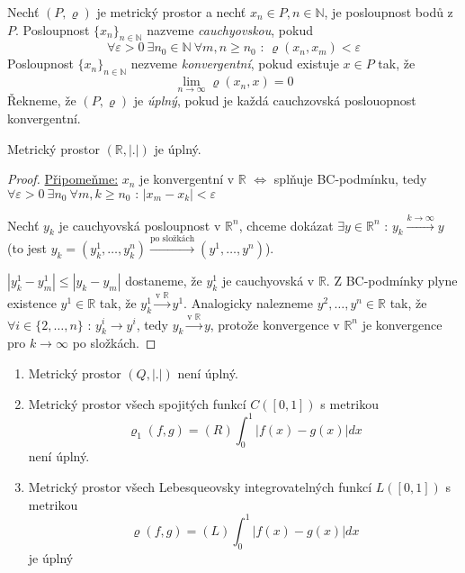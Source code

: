 \begin{definice}
Nechť $(P, \varrho)$ je metrický prostor a nechť $x_n \in P, n \in \mathbb{N}$, je posloupnost bodů z $P$. Posloupnost $\{ x_n \}_{n \in \mathbb{N}}$ nazveme \emph{cauchyovskou}, pokud
$$\forall \varepsilon > 0 \ \exists n_0 \in \mathbb{N} \ \forall m,n \geq n_0 \textrm{ : } \varrho(x_n, x_m) < \varepsilon$$
Posloupnost $\{ x_n \}_{n \in \mathbb{N}}$ nezveme \emph{konvergentní}, pokud existuje $x \in P$ tak, že
$$\lim_{n \rightarrow \infty} \varrho (x_n, x) = 0$$
Řekneme, že $(P, \varrho)$ je \emph{úplný}, pokud je každá cauchzovská poslouopnost konvergentní.
\end{definice}

\begin{vetal}
Metrický prostor $(\mathbb{R}, |.|)$ je úplný.
\end{vetal}

\begin{proof}
\underline{Připomeňme:} $x_n$ je konvergentní v $\mathbb{R}$ $\Leftrightarrow$ splňuje BC-podmínku, tedy $\forall \varepsilon > 0 \ \exists n_0 \ \forall m,k \geq n_0 \textrm{ : } |x_m - x_k| < \varepsilon$

Nechť $y_k$ je cauchyovská posloupnost v $\mathbb{R}^n$, chceme dokázat $\exists y \in \mathbb{R}^n \textrm{ : } y_k \overset{k \to \infty}{\to} y$ (to jest $y_k = (y_k^1, \ldots, y_k^n) \overset{\textrm{po složkách}}{\to} (y^1, \ldots, y^n)$).

$|y_k^1 - y_m^1| \leq |y_k - y_m|$ dostaneme, že $y_k^1$ je cauchyovská v $\mathbb{R}$. Z BC-podmínky plyne existence $y^1 \in \mathbb{R}$ tak, že $y_k^1 \overset{\textrm{v }\mathbb{R}}{\to} y^1$. Analogicky nalezneme $y^2, \ldots, y^n \in \mathbb{R}$ tak, že $\forall i \in \{ 2, \ldots, n \} \textrm{ : } y_k^i \to y^i$, tedy $y_k \overset{\textrm{v } \mathbb{R}}{\to} y$, protože konvergence v $\mathbb{R}^n$ je konvergence pro $k \to \infty$ po složkách.
\end{proof}


\begin{priklad}
\begin{enumerate}
\item Metrický prostor $(Q, |.|)$ není úplný.
\item Metrický prostor všech spojitých funkcí $C([0, 1])$ s metrikou
$$\varrho_1(f,g) = (R) \int_0^1 |f(x) - g(x)| dx$$
není úplný.
\item Metrický prostor všech Lebesqueovsky integrovatelných funkcí $L([0,1])$ s metrikou
$$\varrho(f,g) = (L) \int_0^1 |f(x)-g(x)|dx$$
je úplný
\end{enumerate}
\end{priklad}

